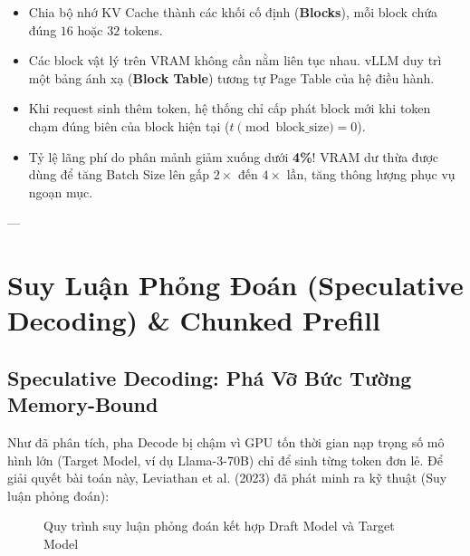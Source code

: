 \begin{itemize}
  \item Chia bộ nhớ KV Cache thành các khối cố định (\textbf{Blocks}), mỗi block chứa đúng $16$ hoặc $32$ tokens.
  \item Các block vật lý trên VRAM không cần nằm liên tục nhau. vLLM duy trì một bảng ánh xạ (\textbf{Block Table}) tương tự Page Table của hệ điều hành.
  \item Khi request sinh thêm token, hệ thống chỉ cấp phát block mới khi token chạm đúng biên của block hiện tại ($t \pmod{\text{block\_size}} = 0$).
  \item Tỷ lệ lãng phí do phân mảnh giảm xuống dưới \textbf{4\%}! VRAM dư thừa được dùng để tăng Batch Size lên gấp $2\times$ đến $4\times$ lần, tăng thông lượng phục vụ ngoạn mục.
\end{itemize}

---

\section{Suy Luận Phỏng Đoán (Speculative Decoding) \& Chunked Prefill}
\label{sec:speculative-decoding-chunked-prefill}

\subsection{Speculative Decoding: Phá Vỡ Bức Tường Memory-Bound}
Như đã phân tích, pha Decode bị chậm vì GPU tốn thời gian nạp trọng số mô hình lớn (Target Model, ví dụ Llama-3-70B) chỉ để sinh từng token đơn lẻ.
Để giải quyết bài toán này, Leviathan et al. (2023) đã phát minh ra kỹ thuật  (Suy luận phỏng đoán):

\begin{figure}[htbp]
\centering
{}
\caption{Quy trình suy luận phỏng đoán kết hợp Draft Model và Target Model}
\label{fig:speculative-decoding-flow}
\end{figure}

